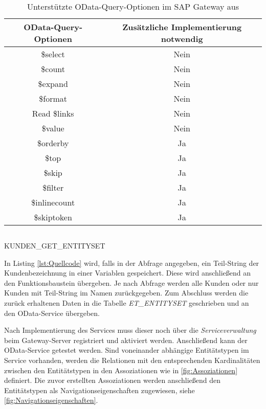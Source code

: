 \begin{table}[h]
	\centering
	\begin{tabular}{cc}
		\toprule OData-Query-Optionen & Zusätzliche Implementierung notwendig \\ 
		\midrule \$select & Nein\\
		\$count & Nein\\
		\$expand & Nein\\
		\$format & Nein\\
		Read \$links & Nein\\
		\$value & Nein\\
		\$orderby & Ja\\
		\$top & Ja\\
		\$skip & Ja\\
		\$filter & Ja\\
		\$inlinecount & Ja\\
		\$skiptoken & Ja\\
		\bottomrule 
	\end{tabular} 
	\caption{Unterstützte OData-Query-Optionen im SAP Gateway aus \cite{SAP2015_3}}
	\label{tab:ODataQueryOptions}
\end{table} 



\begin{listing}[H]
	\inputminted{abap}{src/kundengetentityset.abap}
	\caption{KUNDEN\_GET\_ENTITYSET}
	\label{lst:Quellcode}
\end{listing}

In Listing \ref{lst:Quellcode} wird, falls in der Abfrage angegeben, ein Teil-String der Kundenbezeichnung in einer Variablen gespeichert. Diese wird anschließend an den Funktionsbaustein übergeben. Je nach Abfrage werden alle Kunden oder nur Kunden mit Teil-String im Namen zurückgegeben. Zum Abschluss werden die zurück erhaltenen Daten in die Tabelle \emph{ET\_ENTITYSET} geschrieben und an den OData-Service übergeben.

Nach Implementierung des Services muss dieser noch über die \textit{Serviceverwaltung} beim Gateway-Server registriert und aktiviert werden. Anschließend kann der OData-Service getestet werden.
Sind voneinander abhängige Entitätstypen im Service vorhanden, werden die Relationen mit den entsprechenden Kardinalitäten zwischen den Entitätstypen in den Assoziationen wie in \autoref{fig:Assoziationen} definiert. Die zuvor erstellten Assoziationen werden anschließend den Entitätstypen als Navigationseigenschaften zugewiesen, siehe \autoref{fig:Navigationseigenschaften}.

